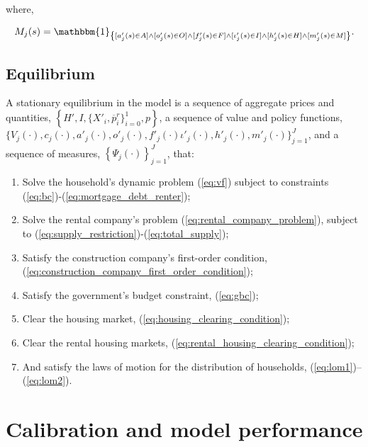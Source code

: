 \documentclass[parskip=full]{article}
\newcommand{\indicator}[1]{\mathbbm{1}_{\left\{ {#1} \right\} }}
\begin{document}
\noindent where,

\begin{align}
    M_{j}(s) = \indicator{[a'_{j}(s)\in A] \land [o'_{j}(s)\in O] \land [f'_{j}(s)\in F] \land [\iota'_{j}(s)\in I] \land [h'_{j}(s) \in H] \land [m'_{j}(s) \in M]}.\notag
\end{align}

\subsection{Equilibrium}
A stationary equilibrium in the model is a sequence of aggregate prices and quantities, $\left\{H',I,\{X'_{i},\overline{p}^{r}_{i}\}^{1}_{i=0},p\right\}$, a sequence of value and policy functions, $\biggl\{V_{j}(\cdot),c_{j}(\cdot),a'_{j}(\cdot),o'_{j}(\cdot),f'_{j}(\cdot)\iota'_{j}(\cdot),h'_{j}(\cdot),m'_{j}(\cdot)\biggl\}_{j=1}^J$, and a sequence of measures, $\left\{\Psi_{j}(\cdot)\right\}_{j=1}^J$, that:
\begin{enumerate}
\item Solve the household's dynamic problem (\ref{eq:vf}) subject to constraints (\ref{eq:bc})-(\ref{eq:mortgage_debt_renter});
\item Solve the rental company's problem (\ref{eq:rental_company_problem}), subject to (\ref{eq:supply_restriction})-(\ref{eq:total_supply});
\item Satisfy the construction company's first-order condition, (\ref{eq:construction_company_first_order_condition});
\item Satisfy the government's budget constraint, (\ref{eq:gbc});
\item Clear the housing market,
(\ref{eq:housing_clearing_condition});
\item Clear the rental housing markets,
(\ref{eq:rental_housing_clearing_condition});
\item And satisfy the laws of motion for the distribution of households, (\ref{eq:lom1})--(\ref{eq:lom2}).
\end{enumerate}

\section{Calibration and model performance}\label{sec:calibration}
\end{document}
